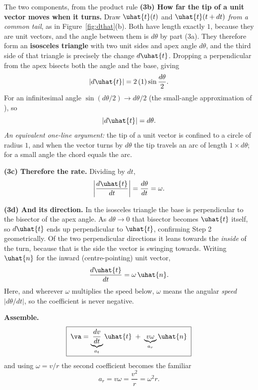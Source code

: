 \begin{derivbox}{The two components, from the product rule}
\smallskip
\textbf{(3b) How far the tip of a unit vector moves when it turns.} Draw $\uhat{t}(t)$ and
$\uhat{t}(t+dt)$ \emph{from a common tail}, as in Figure~\ref{fig:dthat}(b). Both have length exactly $1$, because they are unit
vectors, and the angle between them is $d\theta$ by part (3a). They therefore form an
\textbf{isosceles triangle} with two unit sides and apex angle $d\theta$, and the third side of that
triangle is precisely the change $d\uhat{t}$. Dropping a perpendicular from the apex bisects both the
angle and the base, giving
\[
\left|d\uhat{t}\right| = 2\,(1)\sin\frac{d\theta}{2}.
\]
For an infinitesimal angle $\sin(d\theta/2)\to d\theta/2$ (the small-angle approximation of
), so
\[
\left|d\uhat{t}\right| = d\theta.
\]
\emph{An equivalent one-line argument:} the tip of a unit vector is confined to a circle of radius $1$,
and when the vector turns by $d\theta$ the tip travels an arc of length $1\times d\theta$; for a small
angle the chord equals the arc.

\smallskip
\textbf{(3c) Therefore the rate.} Dividing by $dt$,
\[
\left|\frac{d\uhat{t}}{dt}\right|=\frac{d\theta}{dt}=\omega.
\]

\smallskip
\textbf{(3d) And its direction.} In the isosceles triangle the base is perpendicular to the bisector of
the apex angle. As $d\theta\to0$ that bisector becomes $\uhat{t}$ itself, so $d\uhat{t}$ ends up
perpendicular to $\uhat{t}$, confirming Step 2 geometrically. Of the two perpendicular directions it
leans towards the \emph{inside} of the turn, because that is the side the vector is swinging towards.
Writing $\uhat{n}$ for the inward (centre-pointing) unit vector,
\[
\frac{d\uhat{t}}{dt}=\omega\,\uhat{n}.
\]
Here, and wherever $\omega$ multiplies the speed below, $\omega$ means the angular \emph{speed}
$|d\theta/dt|$, so the coefficient is never negative.

\begin{figbox}
\centering
{}
\end{figbox}

 \textbf{Assemble.}
\[
\boxed{\;\va=\underbrace{\frac{dv}{dt}}_{a_t}\uhat{t}\;+\;\underbrace{v\omega}_{a_r}\uhat{n}\;}
\]
and using $\omega=v/r$ the second coefficient becomes the familiar
\[
a_r=v\omega=\frac{v^{2}}{r}=\omega^{2}r.
\]
\end{derivbox}

